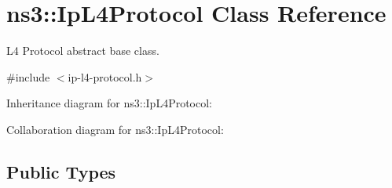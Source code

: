 \hypertarget{classns3_1_1IpL4Protocol}{}\section{ns3\+:\+:Ip\+L4\+Protocol Class Reference}
\label{classns3_1_1IpL4Protocol}


L4 Protocol abstract base class.  




{\ttfamily \#include $<$ip-\/l4-\/protocol.\+h$>$}



Inheritance diagram for ns3\+:\+:Ip\+L4\+Protocol\+:


Collaboration diagram for ns3\+:\+:Ip\+L4\+Protocol\+:
\subsection*{Public Types}
